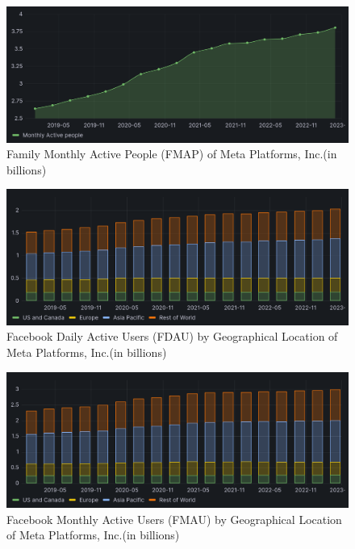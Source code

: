 \documentclass[12pt, a4paper]{article}
\begin{document}
\begin{figure}[H]
    \centering
    \includegraphics[width=1.00\textwidth]{family-map}
    \caption{Family Monthly Active People (FMAP) of Meta Platforms, Inc.(in
    billions)\cite{2023q1,2021q2Slides,2019q4Slides}}
    \label{fig:family-map}
\end{figure}

\begin{figure}[H]
    \centering
    \includegraphics[width=1.00\textwidth]{facebook-dau}
    \caption{Facebook Daily Active Users (FDAU) by Geographical Location of Meta
    Platforms, Inc.(in billions)\cite{2023q1,2021q2Slides,2019q4Slides}}
    \label{fig:facebook-dau}
\end{figure}

\begin{figure}[H]
    \centering
    \includegraphics[width=1.00\textwidth]{facebook-mau}
    \caption{Facebook Monthly Active Users (FMAU) by Geographical Location of
    Meta Platforms, Inc.(in billions)\cite{2023q1,2021q2Slides,2019q4Slides}}
    \label{fig:facebook-mau}
\end{figure}
\end{document}
